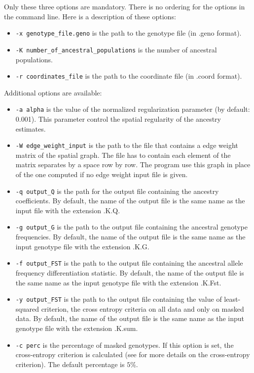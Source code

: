 \documentclass[10pt,a4paper]{article}
\begin{document}
\noindent
Only these three options are mandatory. There is no ordering for the options in the command line. 
Here is a description of these options:
\begin{itemize}
\item \verb|-x genotype_file.geno| is the path to the genotype file (in .geno format).
\item \verb|-K number_of_ancestral_populations| is the number of ancestral populations. 
\item \verb|-r coordinates_file| is the path to the coordinate file (in .coord format). 
\end{itemize}

\noindent
Additional options are available:
\begin{itemize}
\item \verb|-a alpha| is the value of the normalized regularization parameter (by default: 0.001). This parameter control the spatial regularity of the ancestry estimates.
\item \verb|-W edge_weight_input| is the path to the file that contains a edge weight matrix of the spatial graph. The file has to contain each element of the matrix separates by a space row by row. The program use this graph in place of the one computed if no edge weight input file is given.
\item \verb|-q output_Q| is the path for the output file containing the ancestry coefficients. By default, the name of the output file is the same name as the input file with the extension .K.Q.
\item \verb|-g output_G| is the path to the output file containing the ancestral genotype frequencies. By default, the name of the output file is the same name as the input genotype file with the extension .K.G.
\item \verb|-f output_FST| is the path to the output file containing the ancestral allele frequency differentiation statistic. By default, the name of the output file is the same name as the input genotype file with the extension .K.Fst.
\item \verb|-y output_FST| is the path to the output file containing the value of least-squared criterion, the cross entropy criteria on all data and only on masked data. By default, the name of the output file is the same name as the input genotype file with the extension .K.sum.
\item \verb|-c perc| is the percentage of masked genotypes. If this option is set, the cross-entropy criterion is calculated (see\cite{frichot2014fast} for more details on the cross-entropy criterion). The default percentage is $5\%$.

\end{itemize}
\end{document}
